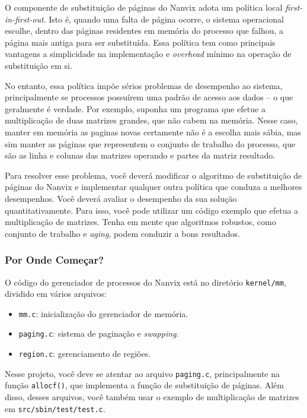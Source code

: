 \documentclass[11pt]{article}
\begin{document}
O componente de substituição de páginas do Nanvix adota um política local \textit{first-in-first-out}. Isto é, quando uma falta de página ocorre, o sistema operacional escolhe, dentro das páginas residentes em memória do processo que falhou, a página mais antiga para ser substituída. Essa política tem como principais vantagens a simplicidade na implementação e \textit{overhead} mínimo na operação de substituição em si.

No entanto, essa política impõe sérios problemas de desempenho ao sistema, principalmente se processos possuírem uma padrão de acesso aos dados -- o que geralmente é verdade. Por exemplo, suponha um programa que efetue a multiplicação de duas matrizes grandes, que não cabem na memória. Nesse caso, manter em memória as paginas novas certamente não é a escolha mais sábia, mas sim manter as páginas que representem o conjunto de trabalho do processo, que são as linha e colunas das matrizes operando e partes da matriz resultado.

Para resolver esse problema, você deverá modificar o algoritmo de substituição de páginas do Nanvix e implementar qualquer outra política que conduza a melhores desempenhos. Você deverá avaliar o desempenho da sua solução quantitativamente. Para isso, você pode utilizar um código exemplo que efetua a multiplicação de matrizes. Tenha em mente que algoritmos robustos, como conjunto de trabalho e \textit{aging}, podem conduzir a bons resultados.

\subsubsection*{Por Onde Começar?}

O código do gerenciador de processos do Nanvix está no diretório \texttt{kernel/mm}, dividido em vários arquivos:

\begin{itemize}
    \item \texttt{mm.c}: inicialização do gerenciador de memória.
    \item \texttt{paging.c}: sistema de paginação e \textit{swapping}.
    \item \texttt{region.c}: gerenciamento de regiões.
\end{itemize}

Nesse projeto, você deve se atentar ao arquivo \texttt{paging.c}, principalmente na função \texttt{allocf()}, que implementa a função de substituição de páginas. Além disso, desses arquivos, você também usar o exemplo de multiplicação de matrizes em \texttt{src/sbin/test/test.c}.
\end{document}

